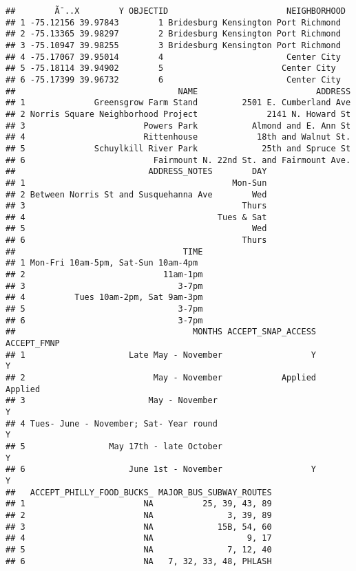 \documentclass[]{article}
\begin{document}
\begin{verbatim}
##        Ã¯..X        Y OBJECTID                        NEIGHBORHOOD
## 1 -75.12156 39.97843        1 Bridesburg Kensington Port Richmond
## 2 -75.13365 39.98297        2 Bridesburg Kensington Port Richmond
## 3 -75.10947 39.98255        3 Bridesburg Kensington Port Richmond
## 4 -75.17067 39.95014        4                         Center City
## 5 -75.18114 39.94902        5                        Center City 
## 6 -75.17399 39.96732        6                         Center City
##                                 NAME                        ADDRESS
## 1              Greensgrow Farm Stand         2501 E. Cumberland Ave
## 2 Norris Square Neighborhood Project              2141 N. Howard St
## 3                        Powers Park           Almond and E. Ann St
## 4                        Rittenhouse            18th and Walnut St.
## 5              Schuylkill River Park             25th and Spruce St
## 6                          Fairmount N. 22nd St. and Fairmount Ave.
##                           ADDRESS_NOTES        DAY
## 1                                          Mon-Sun
## 2 Between Norris St and Susquehanna Ave        Wed
## 3                                            Thurs
## 4                                       Tues & Sat
## 5                                              Wed
## 6                                            Thurs
##                                  TIME
## 1 Mon-Fri 10am-5pm, Sat-Sun 10am-4pm 
## 2                            11am-1pm
## 3                               3-7pm
## 4          Tues 10am-2pm, Sat 9am-3pm
## 5                               3-7pm
## 6                               3-7pm
##                                    MONTHS ACCEPT_SNAP_ACCESS ACCEPT_FMNP
## 1                     Late May - November                  Y           Y
## 2                          May - November            Applied     Applied
## 3                         May - November                               Y
## 4 Tues- June - November; Sat- Year round                               Y
## 5                 May 17th - late October                              Y
## 6                     June 1st - November                  Y           Y
##   ACCEPT_PHILLY_FOOD_BUCKS_ MAJOR_BUS_SUBWAY_ROUTES
## 1                        NA          25, 39, 43, 89
## 2                        NA               3, 39, 89
## 3                        NA             15B, 54, 60
## 4                        NA                   9, 17
## 5                        NA               7, 12, 40
## 6                        NA   7, 32, 33, 48, PHLASH
\end{verbatim}
\end{document}

